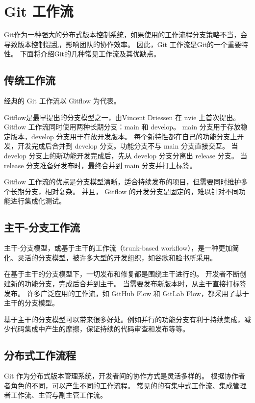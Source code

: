 \documentclass[../main.tex]{subfiles}
\begin{document}
\section{Git 工作流}

Git作为一种强大的分布式版本控制系统，如果使用的工作流程分支策略不当，会导致版本控制混乱，影响团队的协作效率。
因此，Git 工作流是Git的一个重要特性。
下面将介绍Git的几种常见工作流及其优缺点。

\subsection{传统工作流}

经典的 Git 工作流以 Gitflow 为代表。

Gitflow是最早提出的分支模型之一，由Vincent Driessen 在 nvie 上首次提出\cite{gitflow}。
Gitflow 工作流同时使用两种长期分支：main 和 develop。
main 分支用于存放稳定版本，develop 分支用于存放开发版本。
每个新特性都在自己的功能分支上开发，开发完成后合并到 develop 分支。功能分支不与 main 分支直接交互。
当 develop 分支上的新功能开发完成后，先从 develop 分支分离出 release 分支。
当 release 分支准备好发布时，最终合并到 main 分支并打上标签。

Gitflow 工作流的优点是分支模型清晰，适合持续发布的项目，但需要同时维护多个长期分支，相对复杂。
并且， Gitflow 的开发分支是固定的，难以针对不同功能进行集成化测试。

\subsection{主干-分支工作流}

主干-分支模型，或基于主干的工作流（trunk-based workflow），是一种更加简化、灵活的分支模型，被许多大型的开发组织，如谷歌和脸书所采用\cite{trunkbased}。

在基于主干的分支模型下，一切发布和修复都是围绕主干进行的。
开发者不断创建新的功能分支，完成后合并到主干。
当需要发布新版本时，从主干直接打标签发布。
许多广泛应用的工作流，如 GitHub Flow 和 GitLab Flow，都采用了基于主干的分支模型。

基于主干的分支模型可以带来很多好处。例如并行的功能分支有利于持续集成，减少代码集成中产生的摩擦，保证持续的代码审查和发布等等。

\subsection{分布式工作流程}

Git 作为分布式版本管理系统，开发者间的协作方式是灵活多样的。
根据协作者者角色的不同，可以产生不同的工作流程。
常见的的有集中式工作流、集成管理者工作流、主管与副主管工作流。
\end{document}
